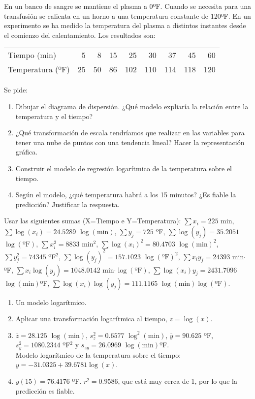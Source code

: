 {En un banco de sangre se mantiene el plasma a 0ºF.
Cuando se necesita para una transfusión se calienta en un horno a una temperatura constante de 120ºF.
En un experimento se ha medido la temperatura del plasma a distintos instantes desde el comienzo del calentamiento.
Los resultados son: 
\begin{center}
\begin{tabular}{lrrrrrrrr}
\toprule
Tiempo (min)	& 5 & 8 & 15 & 25 & 30 & 37 & 45 & 60\\
Temperatura (ºF) & 25 & 50 & 86 & 102 & 110 & 114 & 118 & 120\\
\bottomrule
\end{tabular}
\end{center}
Se pide:
\begin{enumerate}
\item Dibujar el diagrama de dispersión. ¿Qué modelo expliaría la relación entre la temperatura y el tiempo?
\item ¿Qué transformación de escala tendríamos que realizar en las variables para tener una nube de puntos con una
tendencia lineal?
Hacer la representación gráfica. 
\item Construir el modelo de regresión logarítmico de la temperatura sobre el tiempo.
\item Según el modelo, ¿qué temperatura habrá a los 15 minutos?
¿Es fiable la predicción?
Justificar la respuesta.
\end{enumerate}
Usar las siguientes sumas (X=Tiempo e Y=Temperatura): $\sum x_i=225$ min, $\sum \log(x_i)=24.5289$ $\log(\mbox{min})$, $\sum y_j=725$ ºF, $\sum \log⁡(y_j)=35.2051$ $\log(\mbox{ºF})$, $\sum x_i^2=8833$ min$^2$, $\sum \log(x_i)^2=80.4703$ $\log(\mbox{min})^2$, $\sum y_j^2=74345$ ºF$^2$, $\sum \log⁡(y_j)^2=157.1023$ $\log(\mbox{ºF})^2$, $\sum x_iy_j=24393$ min$\cdot$ºF, $\sum x_i\log⁡(y_j)=1048.0142$ min$\cdot \log(\mbox{ºF})$, $\sum \log⁡(x_i)y_j=2431.7096$ $\log(\mbox{min})$ºF, $\sum \log⁡(x_i)\log⁡(y_j)=111.1165$ $\log(\mbox{min})\log(\mbox{ºF})$.
}
{
\begin{enumerate}
\item Un modelo logarítmico.
\item Aplicar una transformación logarítmica al tiempo, $z=\log(x)$.
\item $\bar z=28.125$ $\log(\mbox{min})$, $s_z^2=0.6577$ $\log^2(\mbox{min})$, $\bar y=90.625$ ºF, $s_y^2=1080.2344$ ºF$^2$ y $s_{zy}=26.0969$ $\log(\mbox{min})$ºF.\\
Modelo logarítmico de la temperatura sobre el tiempo: $y=-31.0325+39.6781\log(x)$.
\item $y(15)=76.4176$ ºF. $r^2=0.9586$, que está muy cerca de 1, por lo que la predicción es fiable.
\end{enumerate}
}
{}



